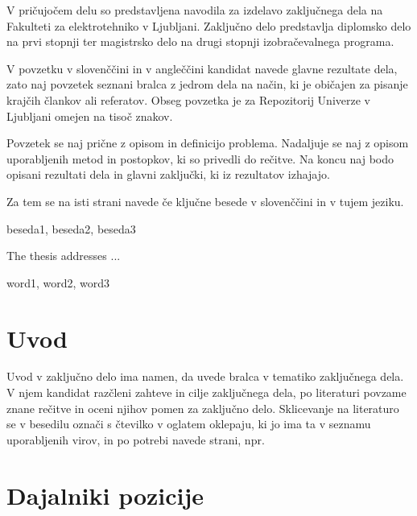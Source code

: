 \documentclass[a4paper,twoside,openright,12pt]{book}
\begin{document}
V pričujočem delu so predstavljena navodila za izdelavo zaključnega
dela na Fakulteti za elektrotehniko v Ljubljani. Zaključno delo
predstavlja diplomsko delo na prvi stopnji ter magistrsko delo na
drugi stopnji izobračevalnega programa.

V povzetku v slovenččini in v angleččini kandidat navede glavne
rezultate dela, zato naj povzetek seznani bralca z jedrom dela na
način, ki je običajen za pisanje krajčih člankov ali referatov.
Obseg povzetka je za Repozitorij Univerze v Ljubljani omejen na tisoč
znakov.

Povzetek se naj prične z opisom in definicijo problema. Nadaljuje se
naj z opisom uporabljenih metod in postopkov, ki so privedli do
rečitve. Na koncu naj bodo opisani rezultati dela in glavni zaključki, ki iz rezultatov
izhajajo.

Za tem se na isti strani navede če ključne besede v slovenččini in v
tujem jeziku.

\kljucnebesede beseda1, beseda2, beseda3


\abstract

The thesis addresses ...

\keywords word1, word2, word3


\chapter{Uvod} \label{uvod}

Uvod v zaključno delo ima namen, da uvede bralca v tematiko
zaključnega dela. V njem kandidat razčleni zahteve in cilje
zaključnega dela, po literaturi povzame znane rečitve in oceni
njihov pomen za zaključno delo. Sklicevanje na literaturo se v
besedilu označi s čtevilko v oglatem oklepaju, ki jo ima ta v
seznamu uporabljenih virov, in po potrebi navede strani, npr.
\cite{miklavvcivc2010objavljanje} 


\chapter{Dajalniki pozicije} \label{Dajalniki pozicije in hitrosti}
\end{document}
